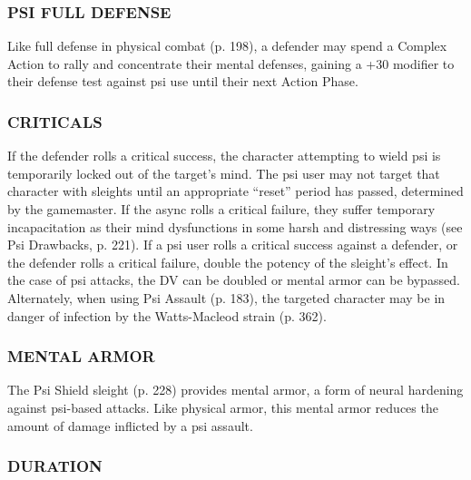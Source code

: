 \subsubsection{PSI FULL DEFENSE} 

Like full defense in physical combat (p. 198), a defender may spend a Complex Action to rally and concentrate their mental defenses, gaining a +30 modifier to their defense test against psi use until their next Action Phase. 

\subsubsection{CRITICALS} 

If the defender rolls a critical success, the character attempting to wield psi is temporarily locked out of the target’s mind. The psi user may not target that character with sleights until an appropriate “reset” period has passed, determined by the gamemaster. If the async rolls a critical failure, they suffer temporary incapacitation as their mind dysfunctions in some harsh and distressing ways (see Psi Drawbacks, p. 221). If a psi user rolls a critical success against a defender, or the defender rolls a critical failure, double the potency of the sleight’s effect. In the case of psi attacks, the DV can be doubled or mental armor can be bypassed. Alternately, when using Psi Assault (p. 183), the targeted character may be in danger of infection by the Watts-Macleod strain (p. 362). 

\subsubsection{MENTAL ARMOR} 

The Psi Shield sleight (p. 228) provides mental armor, a form of neural hardening against psi-based attacks. Like physical armor, this mental armor reduces the amount of damage inflicted by a psi assault. 

\subsubsection{DURATION} 


